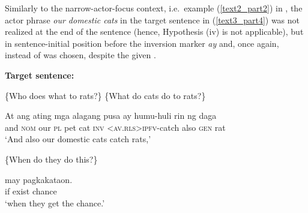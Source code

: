 \documentclass[output=paper,
,modfonts
,nonflat]{langsci/langscibook}
\begin{document}
Similarly to the narrow-actor-focus context, i.e.\ example (\ref{text2_part2}) in , the actor phrase \textit{our domestic cats} in the target sentence in (\ref{text3_part4}) was not realized at the end of the sentence (hence, Hypothesis (iv) is not applicable), but in sentence-initial position before the inversion marker \textit{ay} and, once again,  instead of  was chosen, despite the given .

\begin{exe}
\ex\label{text3_part4}\textbf{Target sentence:}
\begin{xlist}
 \{Who does what to rats?\}
 \{What do cats do to rats?\}
\end{xlist}
\begin{xlist}[{>}>{>}{>}> A\textsubscript{{3.1}}:]
\gll At {{\ob}{\ob}ang} ating mga alagang {pusa{\cb}\ctopic} ay {{\ob}h{\USSmaller}um{\USGreater}u-huli{\cb}\focus} rin {{\ob}ng} {daga{\cb}\topic{\cb}\sq}\\
and \textsc{\void{[[}nom} our \textsc{pl} pet cat \textsc{inv} \textsc{\void{[}<av.rls>ipfv}-catch also \textsc{\void{[}gen} rat\\
\glt `And also our domestic cats catch rats,'
\end{xlist}
\end{exe}
\begin{exe}
\ex\label{text3_part5}
\begin{xlist}[{>}>{>}{>}> A\textsubscript{{3.1}}:]
 \{When do they do this?\}
\end{xlist}
\begin{xlist}[${>}>{>}>{>}>$ A\textsubscript{4}:]
 may {pagkakataon{\cb}\focus{\cb}\sq}.\\
{\void{[[}if} exist chance\\
\glt `when they get the chance.'
\end{xlist}
\end{exe}
\end{document}
